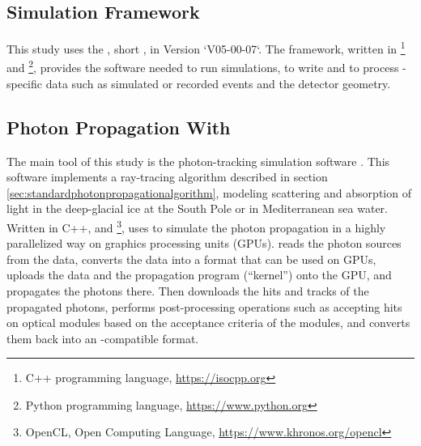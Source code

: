 
\label{sec:tools}

\subsection{\icecube Simulation Framework}

This study uses the , short \icesim, in Version `V05-00-07`.
The framework, written in \footnote{C++ programming language, \url{https://isocpp.org}} and \footnote{Python programming language, \url{https://www.python.org}}, provides the software needed to run simulations, to write and to process \icecube-specific data such as simulated or recorded events and the detector geometry.



\subsection{Photon Propagation With \clsim}

The main tool of this study is the photon-tracking simulation software \clsim. This software implements a ray-tracing algorithm described in section \ref{sec:standardphotonpropagationalgorithm}, modeling scattering and absorption of light in the deep-glacial ice at the South Pole or in Mediterranean sea water. \cite{clsimreadme}
Written in C++,  and \footnote{OpenCL, Open Computing Language, \url{https://www.khronos.org/opencl}}, \clsim uses  to simulate the photon propagation in a highly parallelized way on graphics processing units (GPUs). \cite{clsimsource}
\clsim reads the photon sources from the \icesim data, converts the data into a format that can be used on GPUs, uploads the data and the propagation program (``kernel'') onto the GPU, and propagates the photons there. Then \clsim downloads the hits and tracks of the propagated photons, performs post-processing operations such as accepting hits on optical modules based on the acceptance criteria of the modules, and converts them back into an \icesim-compatible format.

